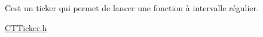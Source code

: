 C\textquotesingle{}est un ticker qui permet de lancer une fonction à intervalle régulier.

\mbox{\hyperlink{_c_t_ticker_8h}{CTTicker.\+h}} 